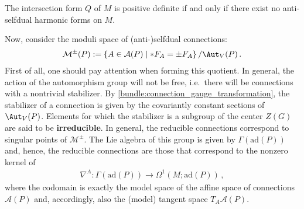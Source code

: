     \begin{property}
        The intersection form $Q$ of $M$ is positive definite if and only if there exist no anti-selfdual harmonic forms on $M$.
    \end{property}

    Now, consider the moduli space of (anti-)selfdual connections:
    \begin{gather}
        \mathcal{M}^\pm(P) := \{A\in\mathcal{A}(P)\mid\ast F_A=\pm F_A\}\, / \Aut_V(P)\,.
    \end{gather}
    First of all, one should pay attention when forming this quotient. In general, the action of the automorphism group will not be free, i.e.~there will be connections with a nontrivial stabilizer. By \cref{bundle:connection_gauge_transformation}, the stabilizer of a connection is given by the covariantly constant sections of $\Aut_V(P)$. Elements for which the stabilizer is a subgroup of the center $Z(G)$ are said to be \textbf{irreducible}. In general, the reducible connections correspond to singular points of $\mathcal{M}^\pm$. The Lie algebra of this group is given by $\Gamma(\mathrm{ad}(P))$ and, hence, the reducible connections are those that correspond to the nonzero kernel of
    \begin{gather}
        \nabla^A:\Gamma(\mathrm{ad}(P))\rightarrow\Omega^1(M;\mathrm{ad}(P))\,,
    \end{gather}
    where the codomain is exactly the model space of the affine space of connections $\mathcal{A}(P)$ and, accordingly, also the (model) tangent space $T_A\mathcal{A}(P)$.

